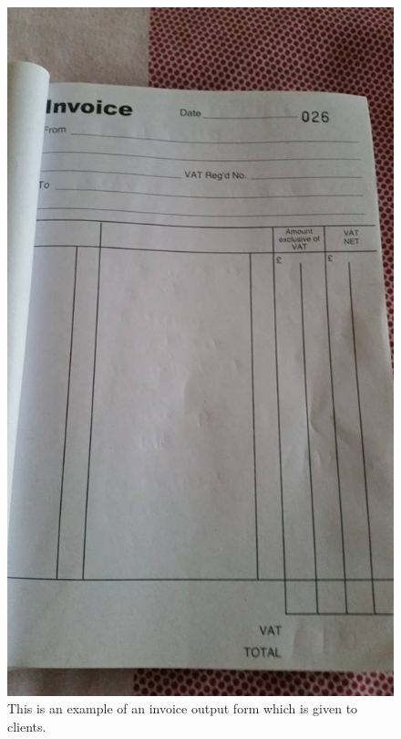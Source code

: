 \begin{figure}[H]
    \includegraphics[scale=0.5]{./Analysis/images/invoice.jpg}
    \caption{This is an example of an invoice output form which is given to clients.} \label{fig:invoice}
\end{figure}

